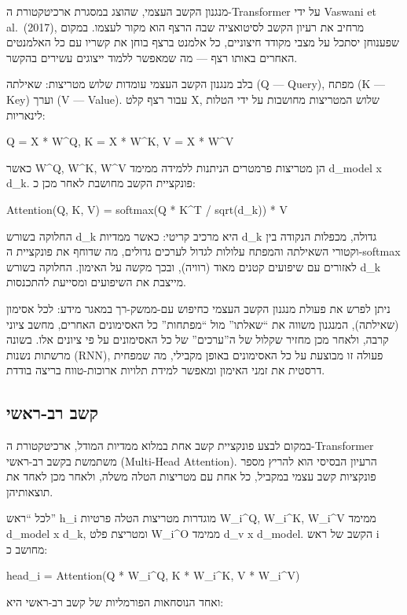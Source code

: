 מנגנון הקשב העצמי, שהוצג במסגרת ארכיטקטורת ה-Transformer על ידי Vaswani
et al.~(2017), מרחיב את רעיון הקשב לסיטואציה שבה הרצף הוא מקור לעצמו.
במקום שפענוחן יסתכל על מצבי מקודד חיצוניים, כל אלמנט ברצף בוחן את קשריו
עם כל האלמנטים האחרים באותו רצף --- מה שמאפשר ללמוד ייצוגים עשירים
בהקשר.

בלב מנגנון הקשב העצמי עומדות שלוש מטריצות: שאילתה (Q --- Query), מפתח (K
--- Key) וערך (V --- Value). עבור רצף קלט X, שלוש המטריצות מחושבות על
ידי הטלות לינאריות:

Q = X * W\^{}Q, K = X * W\^{}K, V = X * W\^{}V

כאשר W\^{}Q, W\^{}K, W\^{}V הן מטריצות פרמטרים הניתנות ללמידה ממימד
d\_model x d\_k. פונקציית הקשב מחושבת לאחר מכן כ:

Attention(Q, K, V) = softmax(Q * K\^{}T / sqrt(d\_k)) * V

החלוקה בשורש d\_k היא מרכיב קריטי: כאשר ממדיות d\_k גדולה, מכפלות הנקודה
בין וקטורי השאילתה והמפתח עלולות לגדול לערכים גדולים, מה שדוחף את
פונקציית ה-softmax לאזורים עם שיפועים קטנים מאוד (רוויה), ובכך מקשה על
האימון. החלוקה בשורש d\_k מייצבת את השיפועים ומסייעת להתכנסות.

ניתן לפרש את פעולת מנגנון הקשב העצמי כחיפוש עם-ממשק-רך במאגר מידע: לכל
אסימון (שאילתה), המנגנון משווה את ``שאלתו'' מול ``מפתחות'' כל האסימונים
האחרים, מחשב ציוני קרבה, ולאחר מכן מחזיר שקלול של ה''ערכים'' של כל
האסימונים על פי ציונים אלו. בשונה מרשתות נשנות (RNN), פעולה זו מבוצעת על
כל האסימונים באופן מקבילי, מה שמפחית דרסטית את זמני האימון ומאפשר למידת
תלויות ארוכות-טווח בריצה בודדת.

\hypertarget{ux5e7ux5e9ux5d1-ux5e8ux5d1-ux5e8ux5d0ux5e9ux5d9}{%
\subsection{קשב
רב-ראשי}\label{ux5e7ux5e9ux5d1-ux5e8ux5d1-ux5e8ux5d0ux5e9ux5d9}}

במקום לבצע פונקציית קשב אחת במלוא ממדיות המודל, ארכיטקטורת ה-Transformer
משתמשת בקשב רב-ראשי (Multi-Head Attention). הרעיון הבסיסי הוא להריץ מספר
פונקציות קשב עצמי במקביל, כל אחת עם מטריצות הטלה משלה, ולאחר מכן לאחד את
תוצאותיהן.

לכל ``ראש'' h\_i מוגדרות מטריצות הטלה פרטיות W\_i\^{}Q, W\_i\^{}K,
W\_i\^{}V ממימד d\_model x d\_k, ומטריצת פלט W\_i\^{}O ממימד d\_v x
d\_model. הקשב של ראש i מחושב כ:

head\_i = Attention(Q * W\_i\^{}Q, K * W\_i\^{}K, V * W\_i\^{}V)

ואחד הנוסחאות הפורמליות של קשב רב-ראשי היא:

